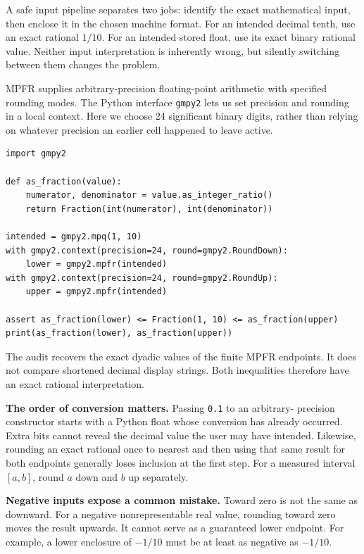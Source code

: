 \newpage
{}
A safe input pipeline separates two jobs: identify the exact mathematical input,
then enclose it in the chosen machine format. For an intended decimal tenth, use
an exact rational $1/10$. For an intended stored float, use its exact binary
rational value. Neither input interpretation is inherently wrong, but silently
switching between them changes the problem.

MPFR supplies arbitrary-precision floating-point arithmetic with specified rounding
modes. The Python interface \texttt{gmpy2} lets us set precision and rounding in a
local context. Here we choose 24 significant binary digits, rather than relying
on whatever precision an earlier cell happened to leave active.
\begin{lstlisting}
import gmpy2

def as_fraction(value):
    numerator, denominator = value.as_integer_ratio()
    return Fraction(int(numerator), int(denominator))

intended = gmpy2.mpq(1, 10)
with gmpy2.context(precision=24, round=gmpy2.RoundDown):
    lower = gmpy2.mpfr(intended)
with gmpy2.context(precision=24, round=gmpy2.RoundUp):
    upper = gmpy2.mpfr(intended)

assert as_fraction(lower) <= Fraction(1, 10) <= as_fraction(upper)
print(as_fraction(lower), as_fraction(upper))
\end{lstlisting}
The audit recovers the exact dyadic values of the finite MPFR endpoints. It does
not compare shortened decimal display strings. Both inequalities therefore have
an exact rational interpretation.

\textbf{The order of conversion matters.} Passing \texttt{0.1} to an arbitrary-
precision constructor starts with a Python float whose conversion has already
occurred. Extra bits cannot reveal the decimal value the user may have intended.
Likewise, rounding an exact rational once to nearest and then using that same
result for both endpoints generally loses inclusion at the first step.
For a measured interval $[a,b]$, round $a$ down and $b$ up separately.

\textbf{Negative inputs expose a common mistake.} Toward zero is not the same
as downward. For a negative nonrepresentable real value, rounding toward zero
moves the result upwards. It cannot serve as a guaranteed lower endpoint.
For example, a lower enclosure of $-1/10$ must be at least as negative as $-1/10$.

